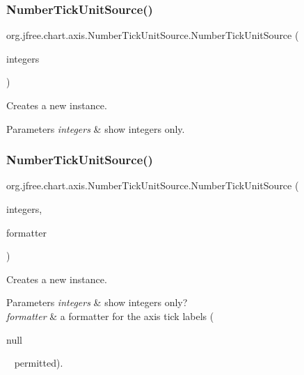\subsubsection{\texorpdfstring{Number\+Tick\+Unit\+Source()}{NumberTickUnitSource()}\hspace{0.1cm}{\footnotesize\ttfamily [2/3]}}
{\footnotesize\ttfamily org.\+jfree.\+chart.\+axis.\+Number\+Tick\+Unit\+Source.\+Number\+Tick\+Unit\+Source (\begin{DoxyParamCaption}\item[{boolean}]{integers }\end{DoxyParamCaption})}

Creates a new instance.


\begin{DoxyParams}{Parameters}
{\em integers} & show integers only. \\
\hline
\end{DoxyParams}
\mbox{\label{classorg_1_1jfree_1_1chart_1_1axis_1_1_number_tick_unit_source_abe7fac69efaf7b4a81a523655d65e50c}} 
\subsubsection{\texorpdfstring{Number\+Tick\+Unit\+Source()}{NumberTickUnitSource()}\hspace{0.1cm}{\footnotesize\ttfamily [3/3]}}
{\footnotesize\ttfamily org.\+jfree.\+chart.\+axis.\+Number\+Tick\+Unit\+Source.\+Number\+Tick\+Unit\+Source (\begin{DoxyParamCaption}\item[{boolean}]{integers,  }\item[{Number\+Format}]{formatter }\end{DoxyParamCaption})}

Creates a new instance.


\begin{DoxyParams}{Parameters}
{\em integers} & show integers only? \\
\hline
{\em formatter} & a formatter for the axis tick labels (
\begin{DoxyCode}
null 
\end{DoxyCode}
 ~\newline
 permitted). \\
\hline
\end{DoxyParams}


